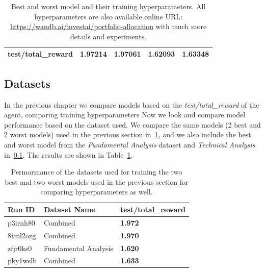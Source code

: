 \documentclass[../xlapes02]{subfiles}
\begin{document}
\begin{table}[!ht]
\begin{tabular}{|l||l|l||l|l|}
            \textbf{test/total\_reward}        & \textcolor[RGB]{50,150,50}{\textbf{1.97214}} & \textcolor[RGB]{50,150,50}{\textbf{1.97061}} & \textcolor[RGB]{150,50,50}{\textbf{1.62093}} & \textcolor[RGB]{150,50,50}{\textbf{1.63348}} \\ \hline
        \end{tabular}
        \caption{Best and worst model and their training hyperparameters. All hyperparameters are also available online URL: \url{https://wandb.ai/investai/portfolio-allocation} with much more details and experiments.}
    \end{table}

    \subsection{Datasets}\label{subsec:datasets}
    In the previous chapter we compare models based on the \emph{test/total\_reward} of the agent, comparing training hyperparameters Now we look and compare model performance based on the dataset used. We compare the same models (2 best and 2 worst models) used in the previous section in~\cref{tab:best-worst-datasets}, and we also include the best and worst model from the \emph{Fundamental Analysis} dataset and \emph{Technical Analysis} in~\cref{subsec:datasets}. The results are shown in Table~\cref{tab:best-worst-datasets}.
    \begin{table}[!ht]
        \centering
        \label{tab:best-worst-datasets}
        \begin{tabular}{|l|l|l|}
            \hline
            \textbf{Run ID} & \textbf{Dataset Name} & \textbf{test/total\_reward}                \\ \hline
            p3irnh80        & Combined              & \textcolor[RGB]{50,150,50}{\textbf{1.972}} \\ \hline
            8tml2ozg        & Combined              & \textcolor[RGB]{50,150,50}{\textbf{1.970}} \\ \hline
            zfjr0ks0        & Fundamental Analysis  & \textcolor[RGB]{150,50,50}{\textbf{1.620}} \\ \hline
            pky1wslb        & Combined              & \textcolor[RGB]{150,50,50}{\textbf{1.633}} \\ \hline
        \end{tabular}
        \caption{Permormance of the datasets used for training the two best and two worst models used in the previous section for comparing hyperparameters as well.}
    \end{table}
\end{document}
